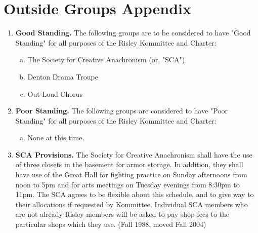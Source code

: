 \documentclass[12pt]{article}
\begin{document}
\section*{Outside Groups Appendix}
\begin{enumerate}[1.]
\item \textbf{Good Standing.} The following groups are to be considered to have "Good Standing" for all purposes of the Risley Kommittee and Charter: 
\begin{enumerate}[a.]
\item The Society for Creative Anachronism (or, "SCA") 
\item Denton Drama Troupe
\item Out Loud Chorus
\end{enumerate}
\item \textbf{Poor Standing.} The following groups are considered to have "Poor Standing" for all purposes of the Risley Kommittee and Charter: 
\begin{enumerate}[a.]
\item None at this time.
\end{enumerate}
\item \textbf{SCA Provisions.} The Society for Creative Anachronism shall have the use of three closets in the basement for armor storage. In addition, they shall have use of the Great Hall for fighting practice on Sunday afternoons from noon to 5pm and for arts meetings on Tuesday evenings from 8:30pm to 11pm. The SCA agrees to be flexible about this schedule, and to give way to their allocations if requested by Kommittee. Individual SCA members who are not already Risley members will be asked to pay shop fees to the particular shops which they use. (Fall 1988, moved Fall 2004)
\end{enumerate}
\end{document}

